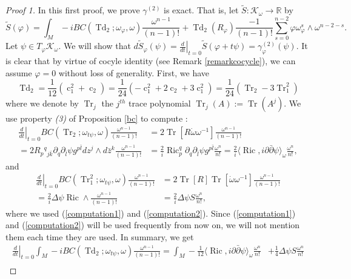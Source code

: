 \documentclass[12pt,reqno,a4paper]{amsart}
\numberwithin{equation}{section}
\def\bz{\bar z}
\def\bk{\bar k}
\def\bl{\bar l}
\def\p{\partial}
\def\bp{\bar\partial}
\DeclareMathOperator{\Td}{Td}
\DeclareMathOperator{\cc}{c}
\DeclareMathOperator{\Tr}{Tr}
\DeclareMathOperator{\ric}{Ric}
\theoremstyle{remark}
\theoremstyle{dotless}
\begin{document}
\begin{proof}[Proof 1]
In this first proof, we prove $\gamma^{(2)}$ is exact. That is, let $\widetilde{S} : \mathcal{K}_\omega \rightarrow \mathbb{R}$ by 
\begin{equation}\label{exact}
\widetilde{S}(\varphi)=\int_M -i BC(\Td_2;\omega_\varphi,\omega)\frac{\omega^{n-1}}{(n-1)!}+\Td_{2}(R_\varphi)\frac{-1}{(n-1)!}\sum^{n-2}_{s=0}\varphi \omega_{\varphi}^s\wedge \omega^{n-2-s}.
\end{equation}
Let $\psi\in T_{\varphi}\mathcal{K}_\omega$. We will show that $d\widetilde{S}_\varphi(\psi)=\left.\frac{d}{dt} \right|_{t=0}\widetilde{S}(\varphi+t\psi)=\gamma^{(2)}_{\varphi}(\psi)$. It is clear that by virtue of cocyle identity (see Remark \ref{remarkcocycle}), we can assume $\varphi=0$ without loss of generality. First, we have 
\begin{equation*}
\Td_2 = \frac{1}{12}(\cc_1^2+\cc_2)=\frac{1}{24}(-\cc_1^2+2\cc_2+3\cc_1^2)=\frac{1}{24}(\Tr_2-3\Tr_1^2)
\end{equation*}
where we denote by $\Tr_j$ the $j^{th}$ trace polynomial $\Tr_j(A):=\Tr(A^j)$. We use property \textit{(3)} of Proposition \ref{bc} to compute :
\begin{align*}
\left.\frac{d}{dt} \right|_{t=0} BC(\Tr_2;\omega_{t\psi},\omega)\frac{\omega^{n-1}}{(n-1)!}&=2\Tr[R\dot{\omega}\omega^{-1}]\frac{\omega^{n-1}}{(n-1)!}\\
=2R_{p}{}^{q}{}_{j\bk}\p_{q}\p_{\bl}\psi g^{p\bl} dz^j\wedge d\bz^k\frac{\omega^{n-1}}{(n-1)!} &= \frac{2}{i}\ric_p^q \p_{q}\p_{\bl}\psi g^{p\bl} \frac{\omega^n}{n!} = \frac{2}{i} \langle \ric,i\p\bp\psi \rangle_\omega \frac{\omega^n}{n!},
\end{align*}
and
\begin{align*}
\left.\frac{d}{dt} \right|_{t=0} BC(\Tr_1^2;\omega_{t\psi},\omega)\frac{\omega^{n-1}}{(n-1)!}&=2\Tr[R]\Tr[\dot{\omega}\omega^{-1}]\frac{\omega^{n-1}}{(n-1)!}\\
=\frac{2}{i}\Delta\psi\ric\wedge \frac{\omega^{n-1}}{(n-1)!}&=\frac{2}{i}\Delta\psi S \frac{\omega^{n}}{n!},
\end{align*}
where we used (\ref{computation1}) and (\ref{computation2}). Since (\ref{computation1}) and (\ref{computation2}) will be used frequently from now on, we will not mention them each time they are used. In summary, we get
\begin{align}\label{ex1}
\left.\frac{d}{dt} \right|_{t=0} \int_M -iBC(\Td_2;\omega_{t\psi},\omega)\frac{\omega^{n-1}}{(n-1)!}=\int_M -\frac{1}{12}\langle \ric,i\p\bp\psi \rangle_\omega \frac{\omega^{n}}{n!} &+\frac{1}{4}\Delta\psi S \frac{\omega^{n}}{n!}\nonumber\\

\end{align}
\end{proof}
\end{document}
